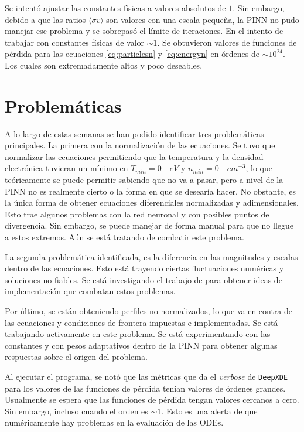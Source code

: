 Se intentó ajustar las constantes físicas a valores absolutos de $1$. Sin embargo, debido a que las ratios $\langle \sigma v\rangle$ son valores con una escala pequeña, la PINN no pudo manejar ese problema y se sobrepasó el límite de iteraciones. En el intento de trabajar con constantes físicas de valor $\sim 1$. Se obtuvieron valores de funciones de pérdida para las ecuaciones \eqref{eq:particlesn} y \eqref{eq:energyn} en órdenes de $\sim 10^{24}$. Los cuales son extremadamente altos y poco deseables.

\section{Problemáticas}

A lo largo de estas semanas se han podido identificar tres problemáticas principales. La primera con la normalización de las ecuaciones. Se tuvo que normalizar las ecuaciones permitiendo que la temperatura y la densidad electrónica tuvieran un mínimo en $T_{min} = 0 \quad eV$ y $n_{min} = 0 \quad cm^{-3}$, lo que teóricamente se puede permitir sabiendo que no va a pasar, pero a nivel de la PINN no es realmente cierto o la forma en que se desearía hacer. No obstante, es la única forma de obtener ecuaciones diferenciales normalizadas y adimensionales. Esto trae algunos problemas con la red neuronal y con posibles puntos de divergencia. Sin embargo, se puede manejar de forma manual para que no llegue a estos extremos. Aún se está tratando de combatir este problema. 

La segunda problemática identificada, es la diferencia en las magnitudes y escalas dentro de las ecuaciones. Esto está trayendo ciertas fluctuaciones numéricas y soluciones no fiables. Se está investigando el trabajo de \cite{chen2026} para obtener ideas de implementación que combatan estos problemas. 

Por último, se están obteniendo perfiles no normalizados, lo que va en contra de las ecuaciones y condiciones de frontera impuestas e implementadas. Se está trabajando activamente en este problema. Se está experimentando con las constantes y con pesos adaptativos dentro de la PINN para obtener algunas respuestas sobre el origen del problema.

Al ejecutar el programa, se notó que las métricas que da el \textit{verbose} de \texttt{DeepXDE} para los valores de las funciones de pérdida tenían valores de órdenes grandes. Usualmente se espera que las funciones de pérdida tengan valores cercanos a cero. Sin embargo, incluso cuando el orden es $\sim 1$. Esto es una alerta de que numéricamente hay problemas en la evaluación de las ODEs. 

